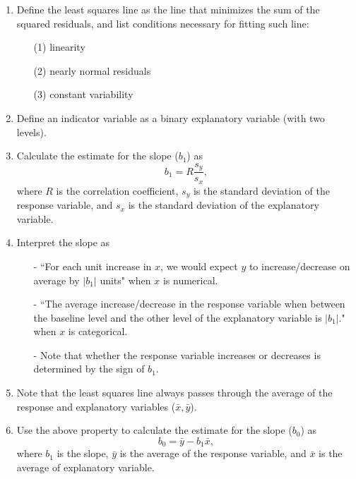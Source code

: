 \documentclass[11pt]{article}
\begin{document}
%

\vspace{0.48cm}

%
\begin{enumerate}[resume]
\renewcommand\labelenumi{\textcolor{light}{\textbf{LO \theenumi.}}}

\item Define the least squares line as the line that minimizes the sum of the squared residuals, and list conditions necessary for fitting such line:
\begin{enumerate}
\item[(1)] linearity
\item[(2)] nearly normal residuals
\item[(3)] constant variability
\end{enumerate}

\item Define an indicator variable as a binary explanatory variable (with two levels).

\item Calculate the estimate for the slope ($b_1$) as 
\[ b_1 = R\frac{s_y}{s_x}, \]
where $R$ is the correlation coefficient, $s_y$ is the standard deviation of the response variable, and $s_x$ is the standard deviation of the explanatory variable.

\item Interpret the slope as 
\begin{itemize}
\item[-] ``For each unit increase in $x$, we would expect $y$ to increase/decrease on average by $|b_1|$ units" when $x$ is numerical.
\item[-] ``The average increase/decrease in the response variable when between the baseline level and the other level of the explanatory variable is $|b_1|$." when $x$ is categorical.
\item[-] Note that whether the response variable increases or decreases is determined by the sign of $b_1$.
\end{itemize}

\item Note that the least squares line always passes through the average of the response and explanatory variables ($\bar{x},\bar{y}$).

\item Use the above property to calculate the estimate for the slope ($b_0$) as 
\[ b_0 = \bar{y} - b_1 \bar{x}, \]
where $b_1$ is the slope, $\bar{y}$ is the average of the response variable, and $\bar{x}$ is the average of explanatory variable.


\end{enumerate}
\end{document}
